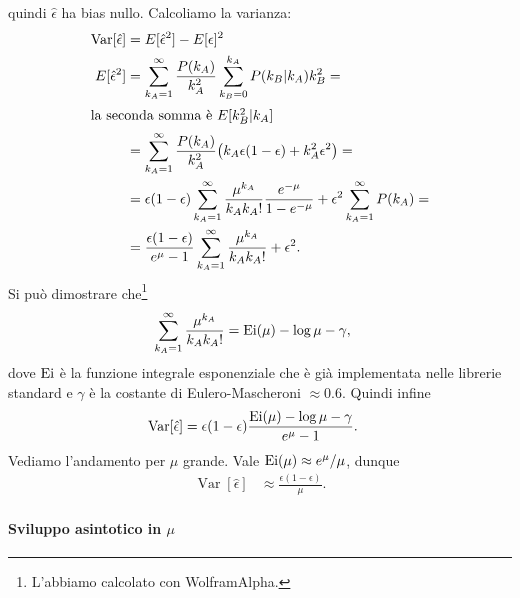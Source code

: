 quindi $\hat\epsilon$ ha bias nullo.
Calcoliamo la varianza:
\begin{align*}
	\operatorname{Var}[\hat\epsilon]
	&= E[\hat\epsilon^2] - E[\epsilon]^2 \\
	E[\hat\epsilon^2]
	&= \sum_{k_A=1}^\infty \frac{P(k_A)}{k_A^2}
	\sum_{k_B=0}^{k_A} P(k_B|k_A) k_B^2 = \\
	\intertext{la seconda somma è $E[k_B^2|k_A]$}
	&= \sum_{k_A=1}^\infty \frac{P(k_A)}{k_A^2}
	\big (k_A\epsilon(1-\epsilon) + k_A^2\epsilon^2 \big) = \\
	&= \epsilon(1-\epsilon) \sum_{k_A=1}^\infty \frac{\mu^{k_A}}{k_Ak_A!}\frac{e^{-\mu}}{1-e^{-\mu}}
	+ \epsilon^2 \sum_{k_A=1}^\infty P(k_A) = \\
	&= \frac{\epsilon(1-\epsilon)}{e^{\mu}-1} \sum_{k_A=1}^\infty \frac{\mu^{k_A}}{k_Ak_A!} + \epsilon^2.
\end{align*}
Si può dimostrare che\footnote{L'abbiamo calcolato con WolframAlpha.}
\begin{align*}
	\sum_{k_A=1}^\infty \frac{\mu^{k_A}}{k_Ak_A!}
	&= \operatorname{Ei}(\mu) - \log\mu - \gamma,
\end{align*}
dove $\operatorname{Ei}$ è la funzione integrale esponenziale che è già implementata nelle librerie standard
e $\gamma$ è la costante di Eulero-Mascheroni $\approx 0.6$.
Quindi infine
\begin{align*}
	\operatorname{Var}[\hat\epsilon]
	&= \epsilon(1-\epsilon)\frac{\operatorname{Ei}(\mu) - \log\mu - \gamma}{e^\mu - 1}.
\end{align*}
Vediamo l'andamento per $\mu$ grande.
Vale $\operatorname{Ei}(\mu) \approx e^{\mu}/\mu$, dunque
\begin{align*}
	\operatorname{Var}[\hat\epsilon]
	&\approx \frac{\epsilon(1-\epsilon)}{\mu}.
\end{align*}

\paragraph{Sviluppo asintotico in $\mu$}

